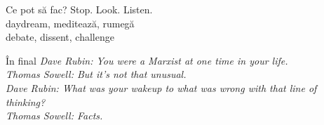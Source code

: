 \documentclass{beamer}
\begin{document}
\begin{frame}{Ce pot să fac?}
  \centering
  \Large
  \pause Stop. Look. Listen. \\
  \pause daydream, meditează, rumegă \\
  \pause debate, dissent, challenge \\
\end{frame}

\begin{frame}{În final}
  \pause \textit{Dave Rubin: You were a Marxist at one time in your life.} \\
  \pause \textit{Thomas Sowell: But it's not that unusual.} \\
  \pause \textit{Dave Rubin: What was your wakeup to what was wrong with that line of thinking?} \\
  \pause \textit{Thomas Sowell: Facts.} \\
\end{frame}
\end{document}
